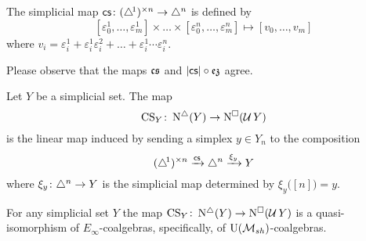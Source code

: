 \begin{definition}
	The simplicial map $\operatorname{\mathsf{cs}} \colon (\triangle^{\!1})^{\times n} \to \triangle^n$ is defined by
	\[
	[\varepsilon_0^1, \dots, \varepsilon_m^1]
	\times \dots \times
	[\varepsilon_0^n, \dots, \varepsilon_m^n]
	\mapsto
	[v_0, \dots, v_m]
	\]
	where $v_i = \varepsilon_i^1 + \varepsilon_i^1 \varepsilon_i^2 + \dots + \varepsilon_i^1 \dotsm \varepsilon_i^n$.
\end{definition}

Please observe that the maps $\operatorname{\mathfrak{cs}}$ and $\lvert\operatorname{\mathsf{cs}}\rvert \circ \operatorname{\mathfrak{ez}}$ agree.

\begin{definition}
	Let $Y$ be a simplicial set.
	The map
	\[
	\operatorname{CS}_Y \colon \operatorname{N^{\triangle}}(Y) \to \operatorname{N^{\square}}(\operatorname{\mathcal{U}} Y)
	\]
	is the linear map induced by sending a simplex $y \in Y_n$ to the composition
	\[
	(\triangle^{\!1})^{\times n} \xrightarrow{\operatorname{\mathsf{cs}}} \triangle^n \xrightarrow{\xi_y} Y
	\]
	where $\xi_y \colon \triangle^n \to Y$ is the simplicial map determined by $\xi_y \big( [n] \big) = y$.
\end{definition}

\begin{theorem} \label{t:main comparison}
	For any simplicial set $Y$ the map $\operatorname{CS}_Y \colon \operatorname{N^{\triangle}}(Y) \to \operatorname{N^{\square}}(\operatorname{\mathcal{U}} Y)$ is a quasi-isomorphism of $E_\infty$-coalgebras, specifically, of ${\operatorname{U}(\mathcal{M}_{sh})}$-coalgebras.
\end{theorem}

